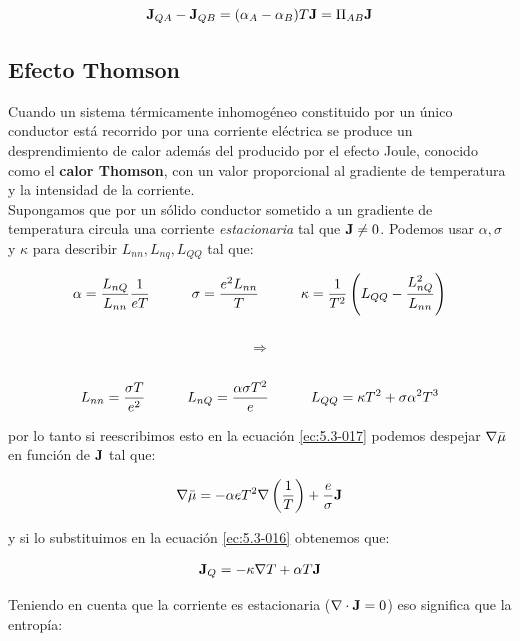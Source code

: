 \documentclass[12pt,a4paper,oneside]{book}
\begin{document}
\begin{equation}
\textbf{J}_{QA} - \textbf{J}_{QB} = (\alpha_A - \alpha_B) T \textbf{J} = \Pi_{AB} \textbf{J}
\end{equation}


\subsection{Efecto Thomson}

Cuando un sistema térmicamente inhomogéneo constituido por un único conductor está recorrido por una corriente eléctrica se produce un desprendimiento de calor además del producido por el efecto Joule, conocido como el \textbf{calor Thomson}, con un valor proporcional al gradiente de temperatura y la intensidad de la corriente. \\

Supongamos que por un sólido conductor sometido a un gradiente de temperatura circula una corriente \textit{estacionaria} tal que $\textbf{J} \neq 0$. Podemos usar $\alpha, \sigma$ y $\kappa$ para describir $L_{nn}, L_{nq}, L_{QQ}$ tal que:

\begin{equation}
\alpha = \dfrac{L_{nQ}}{L_{nn}}
 \dfrac{1}{e T} \quad \quad \quad
\sigma = \dfrac{e^2 L_{nn}}{T} \quad \quad \quad
\kappa = \dfrac{1}{T^2} \left( L_{QQ} - \dfrac{L_{nQ}^2}{L_{nn}} \right) 
\end{equation} \\
$$ \Longrightarrow $$ \\
\begin{equation}
L_{nn} = \dfrac{\sigma T }{e^2}  \quad \quad \quad
L_{nQ} =  \dfrac{\alpha \sigma T^2  }{e} \quad \quad \quad
L_{QQ} =  \kappa T^2 + \sigma \alpha^2 T^3
\end{equation}

por lo tanto si reescribimos esto en la ecuación \ref{ec:5.3-017} podemos despejar $\nabla \bar{\mu}$ en función de $\textbf{J}$ tal que:

\begin{equation}
\nabla \bar{\mu} = - \alpha e T^2 \nabla \left( \dfrac{1}{T} \right) + \dfrac{e}{\sigma} \textbf{J}
\end{equation}

y si lo substituimos en la ecuación \ref{ec:5.3-016} obtenemos que:

\begin{equation}
\textbf{J}_Q = - \kappa \nabla T  + \alpha T \textbf{J}
\end{equation}

Teniendo en cuenta que la corriente es estacionaria ($\nabla \cdot \textbf{J} = 0$) eso significa que la entropía:
\end{document}
